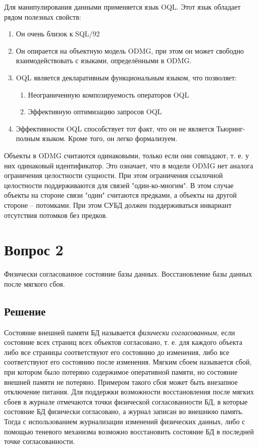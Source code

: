 \documentclass[11pt]{article}
\begin{document}
Для манипулирования данными применяется язык OQL. Этот язык обладает рядом полезных свойств:
\begin{enumerate}
\item Он очень близок к SQL/92
\item Он опирается на объектную модель ODMG, при этом он может свободно взаимодействовать с языками, определёнными в ODMG.
\item OQL является декларативным функциональным языком, что позволяет:
\begin{enumerate}
\item Неограниченную композируемость операторов OQL
\item Эффективную оптимизацию запросов OQL
\end{enumerate}
\item Эффективности OQL способствует тот факт, что он не является Тьюринг-полным языком. Кроме того, он легко формализуем.
\end{enumerate}

Объекты в ODMG считаются одинаковыми, только если они совпадают, т. е. у них одинаковый идентификатор. Это означает, что в модели ODMG нет аналога ограничения целостности сущности. При этом ограничения ссылочной целостности поддерживаются для связей "один-ко-многим". В этом случае объекты на стороне связи "один" считаются предками, а объекты на другой стороне -- потомками. При этом СУБД должен поддерживаться инвариант отсутствия потомков без предков.
\pagebreak
\section{Вопрос 2}
\label{sec:org9a09461}
Физически согласованное состояние базы данных. Восстановление базы данных после мягкого сбоя.
\subsection{Решение}
\label{sec:org97ff53c}
Состояние внешней памяти БД называется \emph{физически согласованным}, если состояние всех страниц всех объектов согласовано, т. е. для каждого объекта либо все страницы соответствуют его состоянию до изменения, либо все соответствуют его состоянию после изменения.
Мягким сбоем называется сбой, при котором было потеряно содержимое оперативной памяти, но состояние внешней памяти не потеряно. Примером такого сбоя может быть внезапное отключение питания.
Для поддержки возможности восстановления после мягких сбоев в журнале отмечаются точки физической согласованности БД, в которые состояние БД физически согласовано, а журнал записан во внешнюю память. Тогда с использованием журнализации изменений физических данных, либо с помощью теневого механизма возможно восстановить состояние БД в последней точке согласованности.
\end{document}
